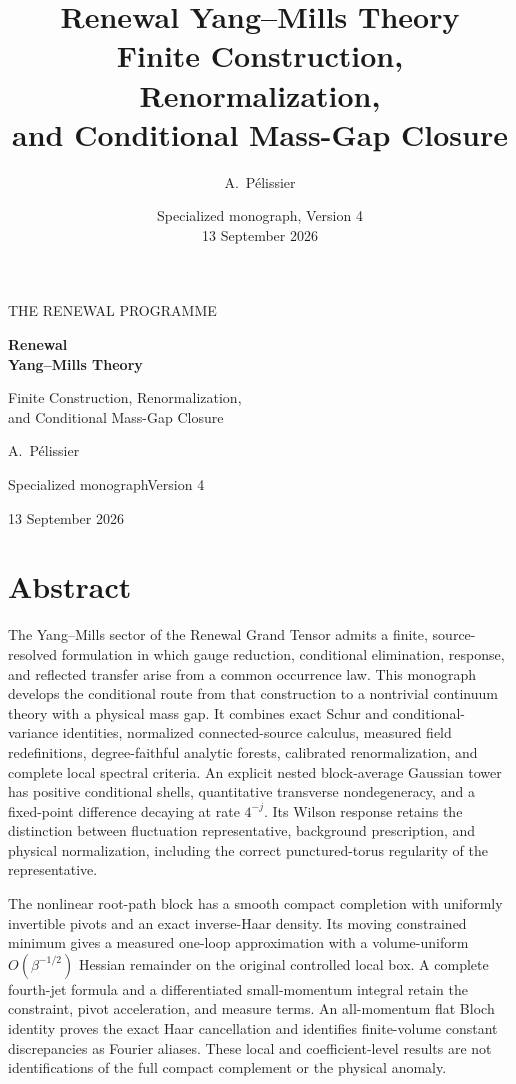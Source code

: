 \documentclass[11pt,oneside,openany]{book}
\title{\textbf{Renewal Yang--Mills Theory}\\[0.55em]\Large Finite Construction, Renormalization,\\and Conditional Mass-Gap Closure}
\author{A.~P\'elissier}
\date{Specialized monograph, Version 4\\13 September 2026}
\theoremstyle{definition}
\theoremstyle{remark}
\begin{document}
\frontmatter
\begin{titlepage}
\centering
\vspace*{25mm}
{\small THE RENEWAL PROGRAMME\par}
\vspace{15mm}
{\Huge\bfseries Renewal\\[3mm]Yang--Mills Theory\par}
\vspace{12mm}
{\Large Finite Construction, Renormalization,\\[2mm]and Conditional Mass-Gap Closure\par}
\vspace{20mm}
{\large A.~P\'elissier\par}
\vfill
{\normalsize Specialized monograph\quad\textbar\quad Version 4\par}
\vspace{3mm}
{\normalsize 13 September 2026\par}
\end{titlepage}
\chapter*{Abstract}
The Yang--Mills sector of the Renewal Grand Tensor admits a finite,
source-resolved formulation in which gauge reduction, conditional
elimination, response, and reflected transfer arise from a common
occurrence law. This monograph develops the conditional route from that
construction to a nontrivial continuum theory with a physical mass gap.
It combines exact Schur and conditional-variance identities, normalized
connected-source calculus, measured field redefinitions, degree-faithful
analytic forests, calibrated renormalization, and complete local
spectral criteria. An explicit nested block-average Gaussian tower has
positive conditional shells, quantitative transverse nondegeneracy, and
a fixed-point difference decaying at rate $4^{-j}$. Its Wilson response
retains the distinction between fluctuation representative, background
prescription, and physical normalization, including the correct
punctured-torus regularity of the representative.

The nonlinear root-path block has a smooth compact completion with
uniformly invertible pivots and an exact inverse-Haar density. Its
moving constrained minimum gives a measured one-loop approximation with
a volume-uniform $O(\beta^{-1/2})$ Hessian remainder on the original
controlled local box. A complete fourth-jet formula and a differentiated
small-momentum integral retain the constraint, pivot acceleration, and
measure terms. An all-momentum flat Bloch identity proves the exact Haar
cancellation and identifies finite-volume constant discrepancies as
Fourier aliases. These local and coefficient-level results are not
identifications of the full compact complement or the physical anomaly.
\end{document}

